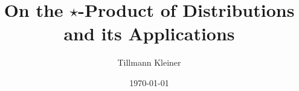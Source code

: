 \title{On the $\star$-Product of Distributions and its Applications}
\author{Tillmann Kleiner}
\date{\today}

\maketitle

\tableofcontents